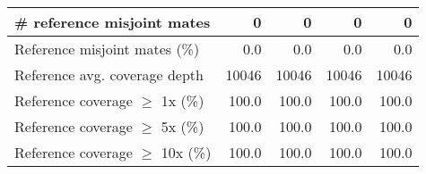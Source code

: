 \documentclass[12pt,a4paper]{article}
\begin{document}
\begin{table}[ht]
\begin{center}
\begin{tabular}{|l*{4}{|r}|}
\# reference misjoint mates & 0 & 0 & 0 & 0 \\ \hline
Reference misjoint mates (\%) & 0.0 & 0.0 & 0.0 & 0.0 \\ \hline
Reference avg. coverage depth & 10046 & 10046 & 10046 & 10046 \\ \hline
Reference coverage $\geq$ 1x (\%) & 100.0 & 100.0 & 100.0 & 100.0 \\ \hline
Reference coverage $\geq$ 5x (\%) & 100.0 & 100.0 & 100.0 & 100.0 \\ \hline
Reference coverage $\geq$ 10x (\%) & 100.0 & 100.0 & 100.0 & 100.0 \\ \hline
\end{tabular}
\end{center}
\end{table}
\end{document}
